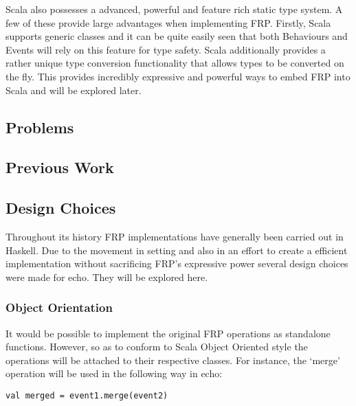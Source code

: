 \documentclass[12pt]{article}
\begin{document}
      Scala also possesses a advanced, powerful and feature rich static type system. A few of these provide large
      advantages when implementing FRP. Firstly, Scala supports generic classes and it can be quite easily seen
      that both Behaviours and Events will rely on this feature for type safety. Scala additionally provides
      a rather unique type conversion functionality that allows types to be converted on the fly. This provides
      incredibly expressive and powerful ways to embed FRP into Scala and will be explored later.
      
    \subsection{Problems}
      
    \subsection{Previous Work}
    
    \subsection{Design Choices}
    Throughout its history FRP implementations have generally been carried out in Haskell. Due to the movement
    in setting and also in an effort to create a efficient implementation without sacrificing FRP's expressive power
    several design choices were made for echo. They will be explored here.
        
      \subsubsection{Object Orientation}
        It would be possible to implement the original FRP operations as standalone functions. However, so
        as to conform to Scala Object Oriented style the operations will be attached to their respective
        classes. For instance, the `merge' operation will be used in the following way in echo:
        
\begin{verbatim}
val merged = event1.merge(event2)
\end{verbatim}
\end{document}
